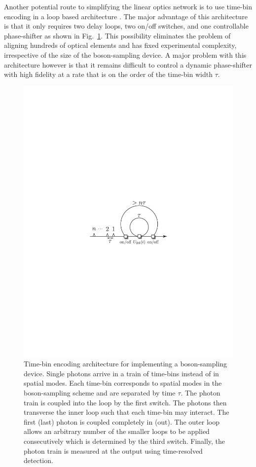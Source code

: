 \documentclass[aps,pra,twocolumn,amsmath,amssymb,nofootinbib,superscriptaddress]{revtex4}
\begin{document}
Another potential route to simplifying the linear optics network is to use time-bin encoding in a loop based architecture \cite{bib:motes2014scalable}. The major advantage of this architecture is that it only requires two delay loops, two on/off switches, and one controllable phase-shifter as shown in Fig.~\ref{fig:fiber_loop}. This possibility eliminates the problem of aligning hundreds of optical elements and has fixed experimental complexity, irrespective of the size of the boson-sampling device. A major problem with this architecture however is that it remains difficult to control a dynamic phase-shifter with high fidelity at a rate that is on the order of the time-bin width $\tau$.

\begin{figure}[!htb]
\includegraphics[width=0.7\columnwidth]{fiber_loop}
\caption{Time-bin encoding architecture for implementing a boson-sampling device. Single photons arrive in a train of time-bins instead of in spatial modes. Each time-bin corresponds to spatial modes in the boson-sampling scheme and are separated by time $\tau$. The photon train is coupled into the loop by the first switch. The photons then transverse the inner loop such that each time-bin may interact. The first (last) photon is coupled completely in (out). The outer loop allows an arbitrary number of the smaller loops to be applied consecutively which is determined by the third switch. Finally, the photon train is measured at the output using time-resolved detection.}
\label{fig:fiber_loop}
\end{figure}
\end{document}
